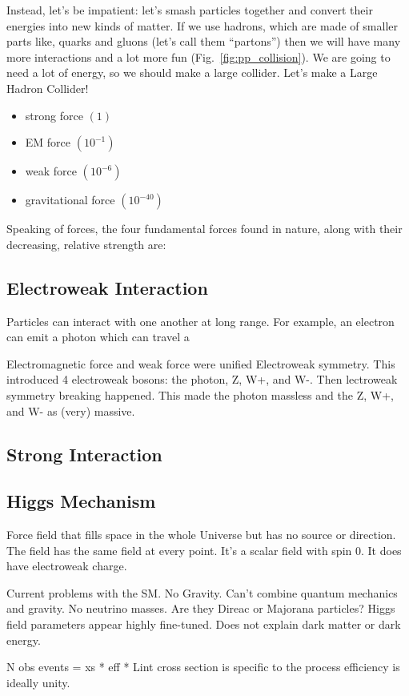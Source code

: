 Instead, let's be impatient: 
let's smash particles together and convert their energies into new kinds of matter. 
If we use hadrons, which are made of smaller parts like, quarks and gluons 
(let's call them ``partons'') then we will have many more interactions and a lot more fun (Fig.~\ref{fig:pp_collision}).
We are going to need a lot of energy, so we should make a large collider. 
Let's make a Large Hadron Collider!
\begin{itemize}
    \item strong force $(1)$
    \item EM force $(10^{-1})$
    \item weak force $(10^{-6})$
    \item gravitational force $(10^{-40})$
\end{itemize}
Speaking of forces, the four fundamental forces found in nature, along with their decreasing, relative strength are: 


\subsection{Electroweak Interaction}
\label{sec:ew_inter}

Particles can interact with one another at long range.
For example, an electron can emit a photon which can travel a 

Electromagnetic force and weak force were unified Electroweak symmetry.
This introduced 4 electroweak bosons: the photon, Z, W+, and W-.
Then lectroweak symmetry breaking happened.
This made the photon massless and the Z, W+, and W- as (very) massive.

\subsection{Strong Interaction}
\label{sec:strong_inter}

\subsection{Higgs Mechanism}
\label{sec:higgs_mech}

Force field that fills space in the whole Universe but has no source or direction.
The field has the same field at every point.
It's a scalar field with spin 0.
It does have electroweak charge.

Current problems with the SM.
No Gravity. Can't combine quantum mechanics and gravity.
No neutrino masses. Are they Direac or Majorana particles?
Higgs field parameters appear highly fine-tuned.
Does not explain dark matter or dark energy.

N obs events = xs * eff * Lint 
cross section is specific to the process
efficiency is ideally unity.
